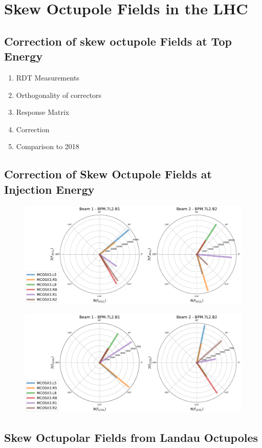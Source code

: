 \chapter{Skew Octupole Fields in the LHC}
\thumbforchapter{}
\chaptertoc{}
\newpage

\section{Correction of skew octupole Fields at Top Energy}

\begin{enumerate}
    \color{red}
    \item RDT Measurements
    \item Orthogonality of correctors
    \item Response Matrix
    \item Correction
    \item Comparison to 2018
\end{enumerate}


\section{Correction of Skew Octupole Fields at Injection Energy}

\begin{figure}[H]
    \includegraphics[width=\textwidth]{./chapters/07_octupoles/images/f1012_y_injection.pdf}
    \caption{}
    \label{fig:a4_injection_orthogonal_f1012}
\end{figure}

\begin{figure}[H]
    \includegraphics[width=\textwidth]{chapters/07_octupoles/images/f1210_x_injection.pdf}
    \caption{}
    \label{fig:a4_injection_orthogonal_f1210}
\end{figure}





\section{Skew Octupolar Fields from Landau Octupoles}